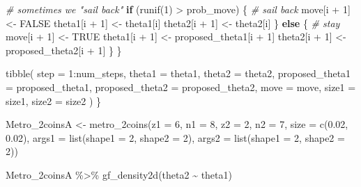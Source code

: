 \documentclass[
  12pt,
]{book}
\newenvironment{Shaded}{\begin{snugshade}}{\end{snugshade}}
\newcommand{\AttributeTok}[1]{\textcolor[rgb]{0.77,0.63,0.00}{#1}}
\newcommand{\CommentTok}[1]{\textcolor[rgb]{0.56,0.35,0.01}{\textit{#1}}}
\newcommand{\ConstantTok}[1]{\textcolor[rgb]{0.00,0.00,0.00}{#1}}
\newcommand{\ControlFlowTok}[1]{\textcolor[rgb]{0.13,0.29,0.53}{\textbf{#1}}}
\newcommand{\DecValTok}[1]{\textcolor[rgb]{0.00,0.00,0.81}{#1}}
\newcommand{\FloatTok}[1]{\textcolor[rgb]{0.00,0.00,0.81}{#1}}
\newcommand{\FunctionTok}[1]{\textcolor[rgb]{0.00,0.00,0.00}{#1}}
\newcommand{\NormalTok}[1]{#1}
\newcommand{\OtherTok}[1]{\textcolor[rgb]{0.56,0.35,0.01}{#1}}
\newcommand{\SpecialCharTok}[1]{\textcolor[rgb]{0.00,0.00,0.00}{#1}}
\theoremstyle{definition}
\theoremstyle{definition}
\theoremstyle{definition}
\theoremstyle{remark}
\begin{document}
\begin{Shaded}
\begin{Highlighting}[]
    \CommentTok{\# sometimes we "sail back"}
    \ControlFlowTok{if}\NormalTok{ (}\FunctionTok{runif}\NormalTok{(}\DecValTok{1}\NormalTok{) }\SpecialCharTok{\textgreater{}}\NormalTok{ prob\_move) \{ }\CommentTok{\# sail back}
\NormalTok{       move[i }\SpecialCharTok{+} \DecValTok{1}\NormalTok{] }\OtherTok{\textless{}{-}} \ConstantTok{FALSE}
\NormalTok{      theta1[i }\SpecialCharTok{+} \DecValTok{1}\NormalTok{] }\OtherTok{\textless{}{-}}\NormalTok{ theta1[i]}
\NormalTok{      theta2[i }\SpecialCharTok{+} \DecValTok{1}\NormalTok{] }\OtherTok{\textless{}{-}}\NormalTok{ theta2[i]}
\NormalTok{    \} }\ControlFlowTok{else}\NormalTok{ \{                    }\CommentTok{\# stay}
\NormalTok{       move[i }\SpecialCharTok{+} \DecValTok{1}\NormalTok{] }\OtherTok{\textless{}{-}} \ConstantTok{TRUE}
\NormalTok{      theta1[i }\SpecialCharTok{+} \DecValTok{1}\NormalTok{] }\OtherTok{\textless{}{-}}\NormalTok{ proposed\_theta1[i }\SpecialCharTok{+} \DecValTok{1}\NormalTok{]}
\NormalTok{      theta2[i }\SpecialCharTok{+} \DecValTok{1}\NormalTok{] }\OtherTok{\textless{}{-}}\NormalTok{ proposed\_theta2[i }\SpecialCharTok{+} \DecValTok{1}\NormalTok{]}
\NormalTok{    \}}
\NormalTok{  \}}
  
  \FunctionTok{tibble}\NormalTok{(}
    \AttributeTok{step =} \DecValTok{1}\SpecialCharTok{:}\NormalTok{num\_steps, }
    \AttributeTok{theta1 =}\NormalTok{ theta1,}
    \AttributeTok{theta2 =}\NormalTok{ theta2,}
    \AttributeTok{proposed\_theta1 =}\NormalTok{ proposed\_theta1,}
    \AttributeTok{proposed\_theta2 =}\NormalTok{ proposed\_theta2,}
    \AttributeTok{move =}\NormalTok{ move, }
    \AttributeTok{size1 =}\NormalTok{ size1,}
    \AttributeTok{size2 =}\NormalTok{ size2}
\NormalTok{  )}
\NormalTok{\}}
\end{Highlighting}
\end{Shaded}

\begin{Shaded}
\begin{Highlighting}[]
\NormalTok{Metro\_2coinsA }\OtherTok{\textless{}{-}} \FunctionTok{metro\_2coins}\NormalTok{(}\AttributeTok{z1 =} \DecValTok{6}\NormalTok{, }\AttributeTok{n1 =} \DecValTok{8}\NormalTok{, }\AttributeTok{z2 =} \DecValTok{2}\NormalTok{, }
    \AttributeTok{n2 =} \DecValTok{7}\NormalTok{, }\AttributeTok{size =} \FunctionTok{c}\NormalTok{(}\FloatTok{0.02}\NormalTok{, }\FloatTok{0.02}\NormalTok{), }\AttributeTok{args1 =} \FunctionTok{list}\NormalTok{(}\AttributeTok{shape1 =} \DecValTok{2}\NormalTok{, }
        \AttributeTok{shape2 =} \DecValTok{2}\NormalTok{), }\AttributeTok{args2 =} \FunctionTok{list}\NormalTok{(}\AttributeTok{shape1 =} \DecValTok{2}\NormalTok{, }\AttributeTok{shape2 =} \DecValTok{2}\NormalTok{))}

\NormalTok{Metro\_2coinsA }\SpecialCharTok{\%\textgreater{}\%} \FunctionTok{gf\_density2d}\NormalTok{(theta2 }\SpecialCharTok{\textasciitilde{}}\NormalTok{ theta1)}
\end{Highlighting}
\end{Shaded}
\end{document}

